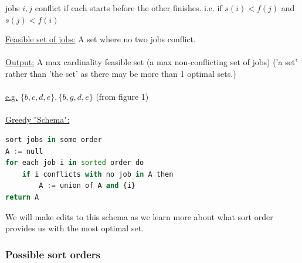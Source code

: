 \documentclass[12pt]{article}
\begin{document}
\begin{tcolorbox}
	jobs $i,j$ conflict if each starts before the other finishes. i.e. if $s(i) < f(j)$ and $s(j) < f(i)$
\end{tcolorbox}

\underline{Feasible set of jobs:} A set where no two jobs conflict.\\
\\
\underline{Output:} A max cardinality feasible set (a max non-conflicting set of jobs) ('a set' rather than 'the set' as there may be more than 1 optimal sets.)\\
\\
\underline{e.g.} $\{ b,c,d,e \}, \{ b,g,d,e \}$ (from figure 1)\\
\\
\underline{Greedy "Schema":}\\
\begin{lstlisting}[language=Python]
sort jobs in some order
A := null
for each job i in sorted order do
	if i conflicts with no job in A then
		A := union of A and {i}
return A
\end{lstlisting}

We will make edits to this schema as we learn more about what sort order provides us with the most optimal set.

\subsubsection{Possible sort orders}
\end{document}
